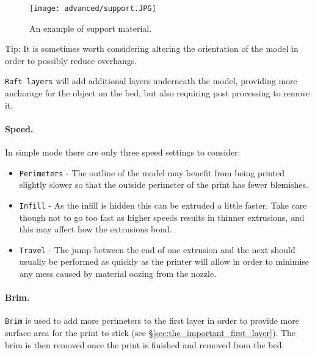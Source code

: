 \begin{figure}[H]
\centering
\texttt{[image: advanced/support.JPG]}
\caption{An example of support material.}
\label{fig:an_example_of_support_material}
\end{figure}

Tip: It is sometimes worth considering altering the orientation of the model in order to possibly reduce overhangs.

\texttt{Raft layers} will add additional layers underneath the model, providing more anchorage for the object on the bed, but also requiring post processing to remove it.

\paragraph{Speed.} %
\label{par:simple_speed}
In simple mode there are only three speed settings to consider:
\begin{itemize}
	\item \texttt{Perimeters}  - The outline of the model may benefit from being printed slightly slower so that the outside perimeter of the print has fewer blemishes.
	\item \texttt{Infill}  - As the infill is hidden this can be extruded a little faster.  Take care though not to go too fast as higher speeds results in thinner extrusions, and this may affect how the extrusions bond.
	\item \texttt{Travel}  - The jump between the end of one extrusion and the next should usually be performed as quickly as the printer will allow in order to minimise any mess caused by material oozing from the nozzle.
\end{itemize}

\paragraph{Brim.} %
\label{par:simple_brim}
\texttt{Brim} is used to add more perimeters to the first layer in order to provide more surface area for the print to stick (see §\ref{sec:the_important_first_layer}). The brim is then removed once the print is finished and removed from the bed.


